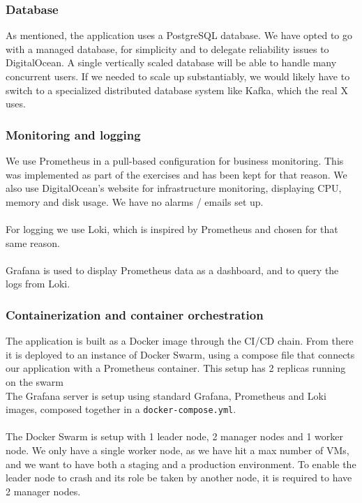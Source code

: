 \subsubsection{Database}
As mentioned, the application uses a PostgreSQL database. We have opted to go with a managed database, for simplicity and to delegate reliability issues to DigitalOcean. A single vertically scaled database will be able to handle many concurrent users. If we needed to scale up substantiably, we would likely have to switch to a specialized distributed database system like Kafka, which the real X uses\cite{kafka}.

\subsubsection*{Monitoring and logging}
We use Prometheus in a pull-based configuration for business monitoring. This was implemented as part of the exercises and has been kept for that reason. We also use DigitalOcean's website for infrastructure monitoring, displaying CPU, memory and disk usage. We have no alarms / emails set up.\\\\
For logging we use Loki, which is inspired by Prometheus and chosen for that same reason\cite{Loki}.\\\\
Grafana is used to display Prometheus data as a dashboard, and to query the logs from Loki.

\subsubsection{Containerization and container orchestration}
The application is built as a Docker image through the CI/CD chain. From there it is deployed to an instance of Docker Swarm, using a compose file that connects our application with a Prometheus container. This setup has 2 replicas running on the swarm \\
The Grafana server is setup using standard Grafana, Prometheus and Loki images, composed together in a \texttt{docker-compose.yml}.\\\\
The Docker Swarm is setup with 1 leader node, 2 manager nodes and 1 worker node. We only have a single worker node, as we have hit a max number of VMs, and we want to have both a staging and a production environment. To enable the leader node to crash and its role be taken by another node, it is required to have 2 manager nodes.\\\\

